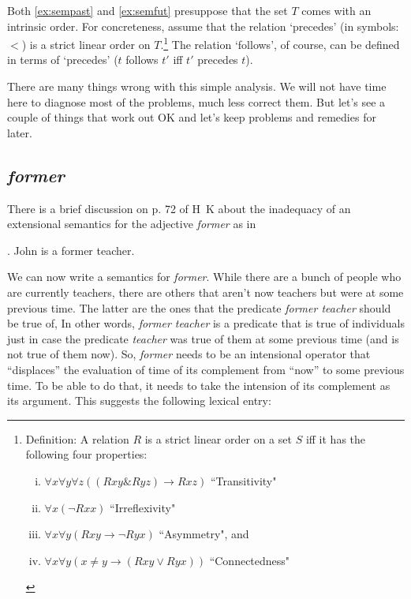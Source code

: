Both \ref{ex:sempast} and \ref{ex:semfut} presuppose that the set $T$ comes with an intrinsic order. For concreteness, assume that the relation `precedes' (in symbols: $<$) is a strict linear order on $T$.\footnote{Definition: A relation $R$ is a strict linear order on a set $S$ iff it has the following four properties:

\vspace{-6pt}\begin{enumerate}[(i)]
	\item $\ensuremath{\forall}x\ensuremath{\forall}y\ensuremath{\forall}z ((Rxy \& Ryz) \ensuremath{\rightarrow} Rxz)$ ``Transitivity"
	\item $\ensuremath{\forall}x (\ensuremath{\neg}Rxx)$ ``Irreflexivity"
	\item $\ensuremath{\forall}x\ensuremath{\forall}y (Rxy \ensuremath{\rightarrow} \ensuremath{\neg}Ryx)$ ``Asymmetry", and
	\item $\ensuremath{\forall}x\ensuremath{\forall}y (x \ensuremath{\neq} y \ensuremath{\rightarrow} (Rxy \ensuremath{\vee} Ryx))$ ``Connectedness"
\end{enumerate}
} The relation `follows', of course, can be defined in terms of `precedes' ($t$ follows $t'$ iff $t'$ precedes $t$).

There are many things wrong with this simple analysis. We will not have time here to diagnose most of the problems, much less correct them. But let's see a couple of things that work out OK and let's keep problems and remedies for later.

\subsection{\emph{former}}

There is a brief discussion on p. 72 of H\amp\ K about the inadequacy of an extensional semantics for the adjective \emph{former} as in 

\ex. John is a former teacher.

We can now write a semantics for \emph{former}. While there are a bunch of people who are currently teachers, there are others that aren't now teachers but were at some previous time. The latter are the ones that the predicate \emph{former teacher} should be true of, In other words, \emph{former teacher} is a predicate that is true of individuals just in case the predicate \emph{teacher} was true of them at some previous time (and is not true of them now). So, \emph{former} needs to be an intensional operator that ``displaces'' the evaluation of time of its complement from ``now'' to some previous time. To be able to do that, it needs to take the intension of its complement as its argument. This suggests the following lexical entry:


